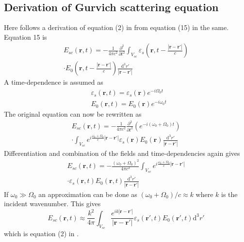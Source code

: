 \documentclass[10pt,a4paper,twocolumn,draft]{scrartcl}
\begin{document}
	\subsection{Derivation of Gurvich scattering equation}
	Here follows a derivation of equation (2) in \cite{Gurvich1987} from equation (15) in the same. Equation 15 is
	\begin{multline*}
		E_{sc} (\bm{r},t) = -\frac{1}{4\pi c^2} \frac{\partial^2}{\partial t^2} \int_{V_{sc}}
		\varepsilon_s\left( \bm{r}, t - \frac{\left|\bm{r}-\bm{r'}\right|}{c} \right)\\
		\cdot E_0 \left( \bm{r}, t - \frac{\left|\bm{r}-\bm{r'}\right|}{c} \right)
		\frac{\mathrm{d}^3r'}{\left|\bm{r}-\bm{r'}\right|}
	\end{multline*}
	A time-dependence is assumed as
	\begin{align*}
		&\varepsilon_s(\bm{r}, t) = \varepsilon_s(\bm{r}) e^{-i\Omega_0 t} \\
		&E_0(\bm{r},t) = E_0(\bm{r}) e^{-i\omega_0 t}
	\end{align*}
	The original equation can now be rewritten as
	\begin{multline*}
	E_{sc} (\bm{r},t) = -\frac{1}{4\pi c^2}
	\frac{\partial^2}{\partial t^2} \left( e^{-i(\omega_0 + \Omega_0)t} \right) \\
	\cdot \int_{V_{sc}} e^{i\frac{\omega_0 + \Omega_0}{c} |\bm{r}-\bm{r'}|}
	\varepsilon_s(\bm{r}) E_0 (\bm{r})
	\frac{\mathrm{d}^3r'}{\left|\bm{r}-\bm{r'}\right|}
	\end{multline*}
	Differentiation and combination of the fields and time-dependencies again gives
	\begin{multline*}
	E_{sc} (\bm{r},t) = -\frac{(\omega_0 + \Omega_0)^2}{4\pi c^2}
	\int_{V_{sc}} e^{i\frac{\omega_0 + \Omega_0}{c} |\bm{r}-\bm{r'}|}\\
	\cdot \varepsilon_s(\bm{r},t) E_0 (\bm{r},t)
	\frac{\mathrm{d}^3r'}{\left|\bm{r}-\bm{r'}\right|}
	\end{multline*}
	If $\omega_0 \gg \Omega_0$ an approximation can be done as $(\omega_0 + \Omega_0)/c \approx k$ where $k$ is the incident wavenumber. This gives
	\begin{equation*}
	E_{sc}(\bm{r},t) \approx \frac{k^2}{4\pi} \int_{V_{sc}} \frac{e^{ik \left| \bm{r}-\bm{r'} \right| }}{ \left| \bm{r}-\bm{r'} \right| } \varepsilon_s (\bm{r'},t) E_0 (\bm{r'},t) \mathrm{d}^3r'
	\end{equation*}
	which is equation (2) in \cite{Gurvich1987}.
	
	\begin{comment}
	\begin{figure}
		\centering
		\texttt{[image: C:/Users/tfy13nwi/Documents/Capture.png]}
		\caption{Error message}
	\end{figure}
	\end{comment}
	
	\small
	
	
	
\end{document}
